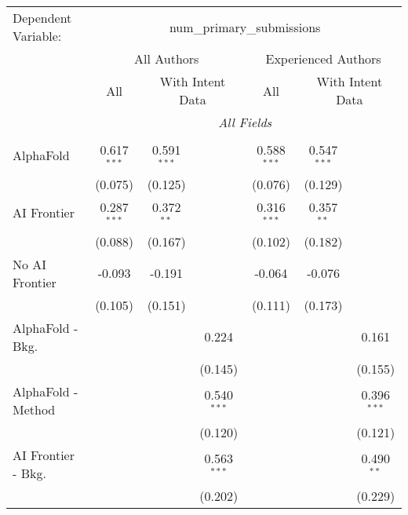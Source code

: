 \begingroup
\centering
\begin{tabular}{lcccccc}
   \tabularnewline \midrule \midrule
   Dependent Variable: & \multicolumn{6}{c}{num\_primary\_submissions}\\
 & \multicolumn{3}{c}{All Authors} & \multicolumn{3}{c}{Experienced Authors} \\
\cmidrule(lr){2-4} \cmidrule(lr){5-7}
 & \multicolumn{1}{c}{All} & \multicolumn{2}{c}{With Intent Data} & \multicolumn{1}{c}{All} & \multicolumn{2}{c}{With Intent Data} \\
\cmidrule(lr){2-2} \cmidrule(lr){3-4} \cmidrule(lr){5-5} \cmidrule(lr){6-7}
 & \multicolumn{6}{c}{\textit{All Fields}} \\ \\
   AlphaFold               & 0.617$^{***}$ & 0.591$^{***}$ &               & 0.588$^{***}$ & 0.547$^{***}$ &   \\   
                           & (0.075)       & (0.125)       &               & (0.076)       & (0.129)       &   \\   
   AI Frontier             & 0.287$^{***}$ & 0.372$^{**}$  &               & 0.316$^{***}$ & 0.357$^{**}$  &   \\   
                           & (0.088)       & (0.167)       &               & (0.102)       & (0.182)       &   \\   
   No AI Frontier          & -0.093        & -0.191        &               & -0.064        & -0.076        &   \\   
                           & (0.105)       & (0.151)       &               & (0.111)       & (0.173)       &   \\   
   AlphaFold - Bkg.        &               &               & 0.224         &               &               & 0.161\\   
                           &               &               & (0.145)       &               &               & (0.155)\\   
   AlphaFold - Method      &               &               & 0.540$^{***}$ &               &               & 0.396$^{***}$\\   
                           &               &               & (0.120)       &               &               & (0.121)\\   
   AI Frontier - Bkg.      &               &               & 0.563$^{***}$ &               &               & 0.490$^{**}$\\   
                           &               &               & (0.202)       &               &               & (0.229)\\   

\end{tabular}
